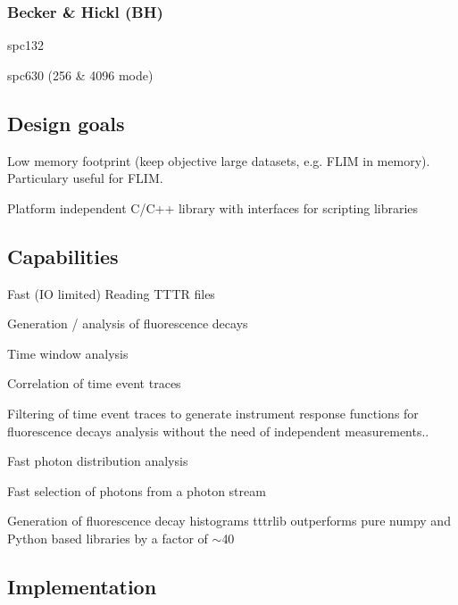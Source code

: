 \subsubsection*{Becker \& Hickl (BH)}


\begin{DoxyItemize}
\item spc132
\item spc630 (256 \& 4096 mode)
\end{DoxyItemize}

\subsection*{Design goals}


\begin{DoxyItemize}
\item Low memory footprint (keep objective large datasets, e.\+g. F\+L\+IM in memory). Particulary useful for F\+L\+IM.
\item Platform independent C/\+C++ library with interfaces for scripting libraries
\end{DoxyItemize}

\subsection*{Capabilities}


\begin{DoxyItemize}
\item Fast (IO limited) Reading T\+T\+TR files
\item Generation / analysis of fluorescence decays
\item Time window analysis
\item Correlation of time event traces
\item Filtering of time event traces to generate instrument response functions for fluorescence decays analysis without the need of independent measurements..
\item Fast photon distribution analysis
\item Fast selection of photons from a photon stream
\end{DoxyItemize}

Generation of fluorescence decay histograms tttrlib outperforms pure numpy and Python based libraries by a factor of $\sim$40

\subsection*{Implementation}

